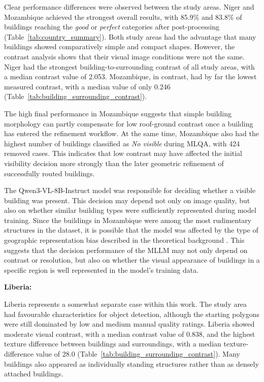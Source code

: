 Clear performance differences were observed between the study areas. Niger and Mozambique achieved the strongest overall results, with 85.9\% and 83.8\% of buildings reaching the \textit{good} or \textit{perfect} categories after post-processing (Table~\ref{tab:country_summary}). Both study areas had the advantage that many buildings showed comparatively simple and compact shapes. However, the contrast analysis shows that their visual image conditions were not the same. Niger had the strongest building-to-surrounding contrast of all study areas, with a median contrast value of 2.053. Mozambique, in contrast, had by far the lowest measured contrast, with a median value of only 0.246 (Table~\ref{tab:building_surrounding_contrast}).

The high final performance in Mozambique suggests that simple building morphology can partly compensate for low roof-ground contrast once a building has entered the refinement workflow. At the same time, Mozambique also had the highest number of buildings classified as \textit{No visible} during MLQA, with 424 removed cases. This indicates that low contrast may have affected the initial visibility decision more strongly than the later geometric refinement of successfully routed buildings.

The Qwen3-VL-8B-Instruct model was responsible for deciding whether a visible building was present. This decision may depend not only on image quality, but also on whether similar building types were sufficiently represented during model training. Since the buildings in Mozambique were among the most rudimentary structures in the dataset, it is possible that the model was affected by the type of geographic representation bias described in the theoretical background \citep{shankar2017classificationrepresentationassessinggeodiversity, yin2023givlimprovinggeographicalinclusivity}. This suggests that the decision performance of the MLLM may not only depend on contrast or resolution, but also on whether the visual appearance of buildings in a specific region is well represented in the model's training data.

\textbf{Liberia:}

Liberia represents a somewhat separate case within this work. The study area had favourable characteristics for object detection, although the starting polygons were still dominated by low and medium manual quality ratings. Liberia showed moderate visual contrast, with a median contrast value of 0.838, and the highest texture difference between buildings and surroundings, with a median texture-difference value of 28.0 (Table~\ref{tab:building_surrounding_contrast}). Many buildings also appeared as individually standing structures rather than as densely attached buildings.

